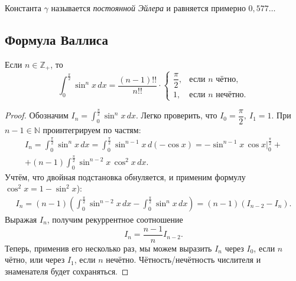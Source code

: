 \begin{remark}
	Константа \(\gamma\) называется \textit{постоянной Эйлера} и равняется примерно \(0,577\ldots\)
\end{remark}

\subsection{Формула Валлиса}

\hypertarget{vallem}{}
\begin{lemma}
	Если \(n \in \mathbb{Z}_+\), то \[
	\int_0^{\frac{\pi}{2}} \sin^n x \, dx = \frac{(n - 1)!!}{n!!} \cdot
	\begin{cases}
		\dfrac{\pi}{2}, &\text{если \(n\) чётно}, \\
		1, 				&\text{если \(n\) нечётно}.
	\end{cases}
	\]
\end{lemma}

\begin{proof}
	Обозначим \(I_n = \displaystyle\int_0^{\frac{\pi}{2}} \sin^n x \, dx\). Легко проверить, что \(I_0 = \dfrac{\pi}{2}, \ I_1 = 1\). При \(n - 1 \in \mathbb{N}\) проинтегрируем по частям:
	\begin{multline*}
		I_n = \int_0^{\frac{\pi}{2}} \sin^n x \, dx = \int_0^{\frac{\pi}{2}} \sin^{n - 1} x \, d(-\cos x) = -\sin^{n - 1} x \, \cos x \bigg|_0^{\frac{\pi}{2}} + \\ 
		+ (n - 1) \int_0^\frac{\pi}{2} \sin^{n - 2} x \, \cos^2 x \, dx.
	\end{multline*}
	Учтём, что двойная подстановка обнуляется, и применим формулу \linebreak \(\cos^2 x = 1 - \sin^2 x\)):
	\begin{multline*}
		I_n = (n - 1) \left(\int_0^\frac{\pi}{2} \sin^{n - 2} x \, dx - \int_0^\frac{\pi}{2} \sin^n x \, dx \right) = (n - 1) (I_{n - 2} - I_n).
	\end{multline*}
	Выражая \(I_n\), получим рекуррентное соотношение \[
	I_n = \frac{n - 1}{n} I_{n - 2}.
	\]
	Теперь, применив его несколько раз, мы можем выразить \(I_n\) через \(I_0\), если \(n\) чётно, или через \(I_1\), если \(n\) нечётно. Чётность/нечётность числителя и знаменателя будет сохраняться.
\end{proof}

